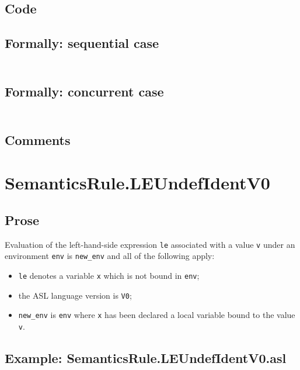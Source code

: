 \documentclass{book}
\begin{document}
  \subsection{Code}

  \subsection{Formally: sequential case}
  \begin{align}
  \end{align} 

  \subsection{Formally: concurrent case}
  \begin{align}
  \end{align} 

    \subsection{Comments}

\section{SemanticsRule.LEUndefIdentV0 \label{sec:SemanticsRule.LEUndefIdentV0}}

    \subsection{Prose}
    Evaluation of the left-hand-side expression \texttt{le} associated with a
value \texttt{v} under an environment \texttt{env} is \texttt{new\_env} and all
of the following apply:
    \begin{itemize}
    \item \texttt{le} denotes a variable \texttt{x} which is not bound in \texttt{env};
    \item the ASL language version is \texttt{V0};
    \item \texttt{new\_env} is \texttt{env} where \texttt{x} has been declared
a local variable bound to the value \texttt{v}.
    \end{itemize}

  \subsection{Example: SemanticsRule.LEUndefIdentV0.asl}
\end{document}
